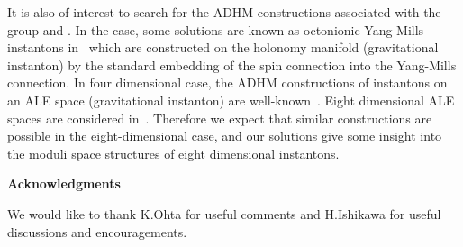 \documentclass[a4paper,12pt]{article}
\begin{document}
It is also of interest to search for the ADHM constructions
associated with the group \coordHE{} and \coordHE{}.
In the \coordHE{} case, some solutions are known 
as octonionic Yang-Mills instantons in~\cite{ky} which are 
constructed on the \coordHE{} holonomy manifold (gravitational instanton) 
by the standard embedding of the spin connection into 
the Yang-Mills connection.
In four dimensional case, the ADHM constructions of instantons 
on an ALE space (gravitational instanton) are well-known~\cite{dm}.
Eight dimensional ALE spaces are considered in~\cite{joyce, joyce2}.
Therefore we expect that similar constructions are possible 
in the eight-dimensional case, and our solutions give some insight into 
the moduli space structures of eight dimensional instantons.





\bigskip
\bigskip
\centerline{\bf Acknowledgments}

\vskip 0.6cm

We would like to thank K.Ohta for useful comments 
and H.Ishikawa for useful discussions and 
encouragements.




\noindent

\end{document}
